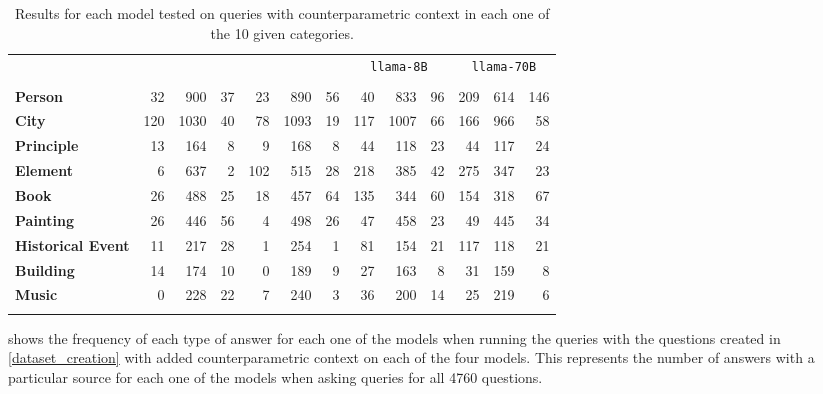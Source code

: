 \begin{table*}[t]
	\caption{Results for each model tested on queries with counterparametric context in each one of the 10 given categories.}
	\label{cats_table}
	\centering
	\footnotesize
	\begin{tabular}{>{\bfseries}l | r r r | r r r | r r r | r r r}
		\toprule
			& \multicolumn{3}{c|}{\smallflan{}} & \multicolumn{3}{c|}{\bigflan{}} & \multicolumn{3}{c|}{\texttt{llama-8B}} & \multicolumn{3}{c}{\texttt{llama-70B}}  \\
			& \Pc{} & \Cc{} & \Oc{} & \Pc{} & \Cc{} & \Oc{} & \Pc{} & \Cc{} & \Oc{} & \Pc{} & \Cc{} & \Oc{}  \\
		\midrule
			Person           &  32 &  900 & 37 &  23 &  890 & 56 &  40 &  833 & 96 & 209 & 614 & 146 \\
			City             & 120 & 1030 & 40 &  78 & 1093 & 19 & 117 & 1007 & 66 & 166 & 966 &  58 \\
			Principle        &  13 &  164 &  8 &   9 &  168 &  8 &  44 &  118 & 23 &  44 & 117 &  24 \\
			Element          &   6 &  637 &  2 & 102 &  515 & 28 & 218 &  385 & 42 & 275 & 347 &  23 \\
			Book             &  26 &  488 & 25 &  18 &  457 & 64 & 135 &  344 & 60 & 154 & 318 &  67 \\
			Painting         &  26 &  446 & 56 &   4 &  498 & 26 &  47 &  458 & 23 &  49 & 445 &  34 \\
			Historical Event &  11 &  217 & 28 &   1 &  254 &  1 &  81 &  154 & 21 & 117 & 118 &  21 \\
			Building         &  14 &  174 & 10 &   0 &  189 &  9 &  27 &  163 &  8 &  31 & 159 &   8 \\
			Music      &   0 &  228 & 22 &   7 &  240 &  3 &  36 &  200 & 14 &  25 & 219 &   6 \\
		\bottomrule \addlinespace[4pt]
	\end{tabular}
\end{table*}

 shows the frequency of each type of answer for each one of the models when running the queries with the questions created in \cref{dataset_creation} with added counterparametric context on each of the four models.
This represents the number of answers with a particular source for each one of the models when asking queries for all 4760 questions.


